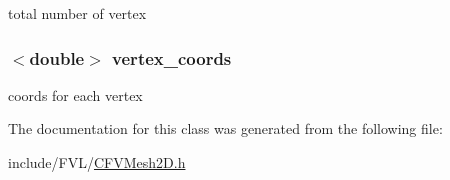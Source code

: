 total number of vertex 

\hypertarget{classFVL_1_1CFVMesh2D_a87d5c74a26438af8208b9ee9fe5608d5}{
\subsubsection[{vertex\_\-coords}]{$<$double$>$ {\bf vertex\_\-coords}}}
\label{da/d8d/classFVL_1_1CFVMesh2D_a87d5c74a26438af8208b9ee9fe5608d5}


coords for each vertex 



The documentation for this class was generated from the following file:\begin{DoxyCompactItemize}
\item 
include/FVL/\hyperlink{CFVMesh2D_8h}{CFVMesh2D.h}\end{DoxyCompactItemize}
